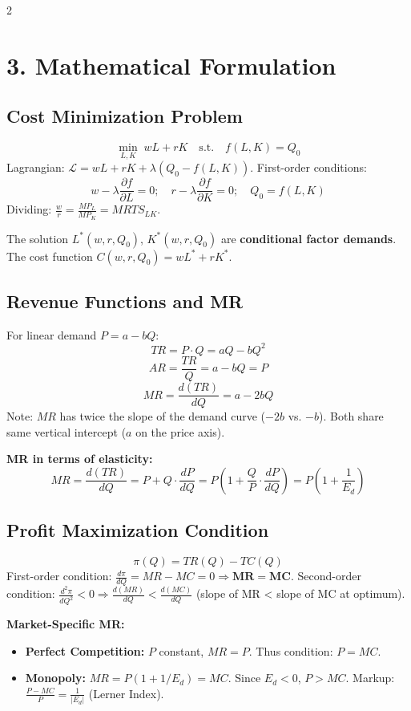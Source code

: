 \documentclass[10pt,a4paper]{article}
\begin{document}
\begin{multicols}{2}
\section*{3. Mathematical Formulation}

\subsection*{Cost Minimization Problem}
\[
\min_{L, K} \; wL + rK \quad \text{s.t.} \quad f(L, K) = Q_0
\]
Lagrangian: $\mathcal{L} = wL + rK + \lambda (Q_0 - f(L, K))$.
First-order conditions:
\[
w - \lambda \frac{\partial f}{\partial L} = 0; \quad r - \lambda \frac{\partial f}{\partial K} = 0; \quad Q_0 = f(L, K)
\]
Dividing: $\frac{w}{r} = \frac{MP_L}{MP_K} = MRTS_{LK}$.

The solution $L^*(w, r, Q_0)$, $K^*(w, r, Q_0)$ are \textbf{conditional factor demands}. The cost function $C(w, r, Q_0) = wL^* + rK^*$.

\subsection*{Revenue Functions and MR}
For linear demand $P = a - bQ$:
\[
TR = P \cdot Q = aQ - bQ^2
\]
\[
AR = \frac{TR}{Q} = a - bQ = P
\]
\[
MR = \frac{d(TR)}{dQ} = a - 2bQ
\]
Note: $MR$ has twice the slope of the demand curve ($-2b$ vs. $-b$). Both share same vertical intercept ($a$ on the price axis).

\textbf{MR in terms of elasticity:}
\[
MR = \frac{d(TR)}{dQ} = P + Q \cdot \frac{dP}{dQ} = P \left(1 + \frac{Q}{P} \cdot \frac{dP}{dQ}\right) = P\left(1 + \frac{1}{E_d}\right)
\]

\subsection*{Profit Maximization Condition}
\[
\pi(Q) = TR(Q) - TC(Q)
\]
First-order condition: $\frac{d\pi}{dQ} = MR - MC = 0 \Rightarrow \mathbf{MR = MC}$.
Second-order condition: $\frac{d^2\pi}{dQ^2} < 0 \Rightarrow \frac{d(MR)}{dQ} < \frac{d(MC)}{dQ}$ (slope of MR < slope of MC at optimum).

\textbf{Market-Specific MR:}
\begin{itemize}[nosep]
    \item \textbf{Perfect Competition:} $P$ constant, $MR = P$. Thus condition: $P = MC$.
    \item \textbf{Monopoly:} $MR = P(1 + 1/E_d) = MC$. Since $E_d < 0$, $P > MC$. Markup: $\frac{P - MC}{P} = \frac{1}{|E_d|}$ (Lerner Index).
\end{itemize}


\end{multicols}
\end{document}
